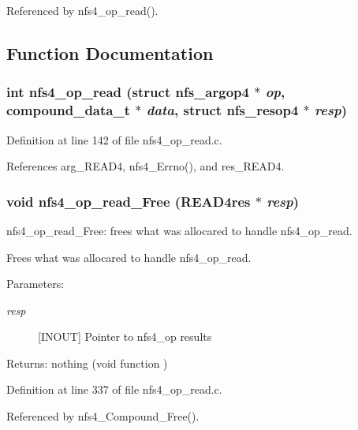 Referenced by nfs4\_\-op\_\-read().

\subsection{Function Documentation}
\subsubsection{\setlength{\rightskip}{0pt plus 5cm}int nfs4\_\-op\_\-read (struct nfs\_\-argop4 $\ast$ {\em op}, compound\_\-data\_\-t $\ast$ {\em data}, struct nfs\_\-resop4 $\ast$ {\em resp})}\label{nfs4__op__read_8c_a2}




Definition at line 142 of file nfs4\_\-op\_\-read.c.

References arg\_\-READ4, nfs4\_\-Errno(), and res\_\-READ4.
\subsubsection{\setlength{\rightskip}{0pt plus 5cm}void nfs4\_\-op\_\-read\_\-Free (READ4res $\ast$ {\em resp})}\label{nfs4__op__read_8c_a3}


nfs4\_\-op\_\-read\_\-Free: frees what was allocared to handle nfs4\_\-op\_\-read.

Frees what was allocared to handle nfs4\_\-op\_\-read.

\begin{Desc}
\item[Parameters:]
\begin{description}
\item[{\em resp}][INOUT] Pointer to nfs4\_\-op results\end{description}
\end{Desc}
\begin{Desc}
\item[Returns:]nothing (void function ) \end{Desc}


Definition at line 337 of file nfs4\_\-op\_\-read.c.

Referenced by nfs4\_\-Compound\_\-Free().
